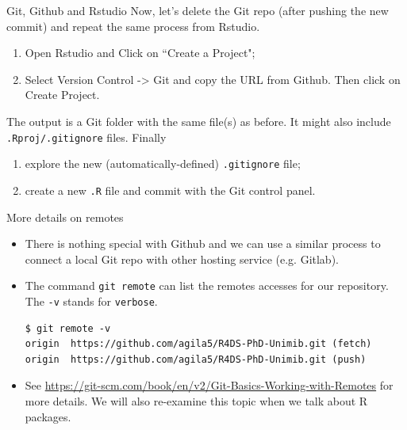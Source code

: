 \documentclass[
hyperref={bookmarks=false},
xcolor={dvipsnames,svgnames*,x11names*}, 
12pt
]{beamer}
\begin{document}
\begin{frame}{Git, Github and Rstudio}
\vspace{-0.5cm}
Now, let's delete the Git repo (after pushing the new commit) and repeat the same process from Rstudio. 
\begin{enumerate}
\itemsep 2ex
\item Open Rstudio and Click on ``Create a Project"; 
\item Select Version Control -> Git and copy the URL from Github. Then click on Create Project. 
\end{enumerate}
The output is a Git folder with the same file(s) as before. It might also include \texttt{.Rproj/.gitignore} files. Finally 
\begin{enumerate}
\item explore the new (automatically-defined) \texttt{.gitignore} file;
\item create a new \texttt{.R} file and commit with the Git control panel.
\end{enumerate}
\end{frame}

\begin{frame}[fragile]{More details on remotes}
\vspace{-0.5cm}
\begin{itemize}
\itemsep 2ex
\item There is nothing special with Github and we can use a similar process to connect a local Git repo with other hosting service (e.g. Gitlab). 
\item The command \texttt{git remote} can list the remotes accesses for our repository. The \texttt{-v} stands for \texttt{verbose}. 
\begin{lstlisting}
$ git remote -v
origin  https://github.com/agila5/R4DS-PhD-Unimib.git (fetch)
origin  https://github.com/agila5/R4DS-PhD-Unimib.git (push)
\end{lstlisting}
\item See \url{https://git-scm.com/book/en/v2/Git-Basics-Working-with-Remotes} for more details. We will also re-examine this topic when we talk about R packages. 
\end{itemize}
\end{frame}

\end{document}
